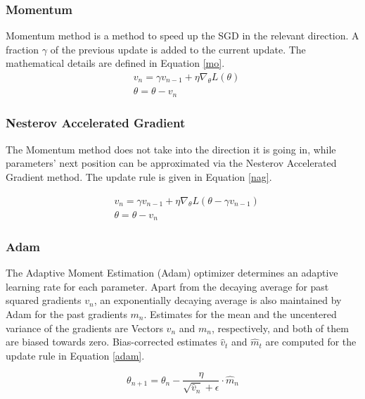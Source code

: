     \subsubsection{Momentum}
    Momentum method is a method to speed up the SGD in the relevant direction.  A fraction $\gamma$ of the previous update is added to the current update. The mathematical details are defined in Equation \ref{mo}.
    \begin{equation}
        \begin{aligned}
            & v_n = \gamma v_{n-1} + \eta \nabla_{\theta}L(\theta) \\
            & \theta= \theta - v_{n}
        \end{aligned}
        \label{mo}
    \end{equation} 

    \subsubsection{Nesterov Accelerated Gradient}
    The Momentum method does not take into the direction it is going in, while parameters’ next position can be approximated via the Nesterov Accelerated Gradient method. The update rule is given in Equation \ref{nag}.

    \begin{equation}
        \begin{aligned}
            & v_n = \gamma v_{n-1} + \eta \nabla_{\theta}L(\theta - \gamma v_{n-1}) \\
            & \theta= \theta - v_{n}
        \end{aligned}
        \label{nag}
    \end{equation}

    \subsubsection{Adam}
    The Adaptive Moment Estimation (Adam) optimizer \cite{DBLP:journals/corr/KingmaB14} determines an adaptive learning rate for each parameter. Apart from the decaying average for past squared gradients $v_n$, an exponentially decaying average is also maintained by Adam for the past gradients $m_n$. Estimates for the mean and the uncentered variance of the gradients are Vectors $v_n$ and $m_n$, respectively, and both of them are biased towards zero. Bias-corrected estimates $\hat{v}_t$ and $\hat{m}_t$ are computed for the update rule in Equation \ref{adam}.

    \begin{equation}
        \theta_{n+1} = \theta_{n} - \frac{\eta}{\sqrt{\hat{v}_n} + \epsilon}\cdot \hat{m}_n
    \end{equation}

